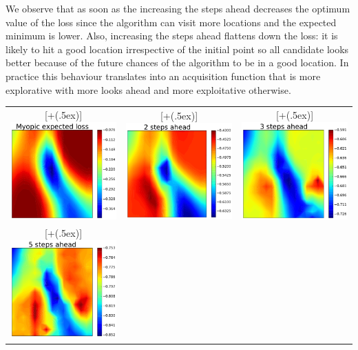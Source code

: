 \documentclass[twoside]{article}
\newcommand*{\addheight}[2][.5ex]{%
  \raisebox{0pt}[\dimexpr\height+(#1)\relax]{#2}%
}
\begin{document}
We observe that as soon as the increasing the steps ahead decreases the optimum value of the loss since the algorithm can visit more locations and the expected minimum is lower. Also, increasing the steps ahead flattens down the loss: it is likely to hit a good location irrespective of the initial point so all candidate looks better because of the future chances of the algorithm to be in a good location. In practice this behaviour translates into an acquisition function that is more explorative with more looks ahead and more exploitative otherwise. 

\begin{table}[t!]
\begin{tabular}{ccc}
      \addheight{\includegraphics[width=54mm]{1_ahead.pdf}} &
      \addheight{\includegraphics[width=54mm]{2_ahead.pdf}}  &
      \addheight{\includegraphics[width=54mm]{3_ahead.pdf}}\\
      \addheight{\includegraphics[width=54mm]{5_ahead.pdf}} &

\end{tabular}
\end{table}
\end{document}
